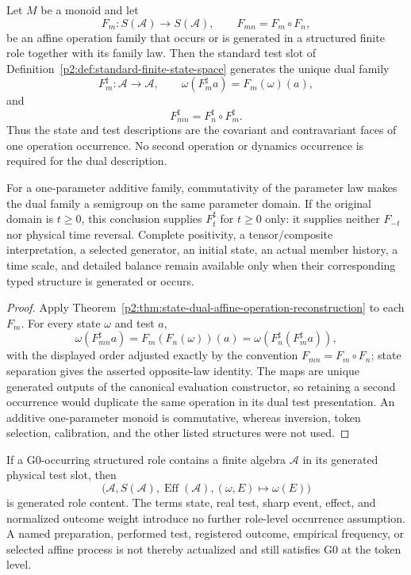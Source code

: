 \documentclass[12pt,a4paper]{article}
\begin{document}
\begin{corollary}
\label{p2a:cor:finite-state-test-dual-dynamics}
Let \(M\) be a monoid and let
\[
 F_m:S(\mathcal A)\longrightarrow S(\mathcal A),
 \qquad F_{mn}=F_m\circ F_n,
\]
be an affine operation family that occurs or is generated in a structured
finite role together with its family law.  Then the standard test slot of
Definition~\ref{p2:def:standard-finite-state-space} generates the unique dual
family
\[
 F_m^\sharp:\mathcal A\longrightarrow\mathcal A,
 \qquad
 \omega(F_m^\sharp a)=F_m(\omega)(a),
\]
and
\[
 F_{mn}^\sharp=F_n^\sharp\circ F_m^\sharp.
\]
Thus the state and test descriptions are the covariant and contravariant
faces of one operation occurrence.  No second operation or dynamics
occurrence is required for the dual description.

For a one-parameter additive family, commutativity of the parameter law makes
the dual family a semigroup on the same parameter domain.  If the original
domain is \(t\ge0\), this conclusion supplies \(F_t^\sharp\) for \(t\ge0\)
only: it supplies neither \(F_{-t}\) nor physical time reversal.  Complete
positivity, a tensor/composite interpretation, a selected generator, an
initial state, an actual member history, a time scale, and detailed balance
remain available only when their corresponding typed structure is generated
or occurs.
\end{corollary}

\begin{proof}
Apply Theorem~\ref{p2:thm:state-dual-affine-operation-reconstruction} to each
\(F_m\).  For every state \(\omega\) and test \(a\),
\[
 \omega(F_{mn}^\sharp a)
 =F_m(F_n(\omega))(a)
 =\omega\!\left(F_n^\sharp(F_m^\sharp a)\right),
\]
with the displayed order adjusted exactly by the convention
\(F_{mn}=F_m\circ F_n\); state separation gives the asserted opposite-law
identity.  The maps are unique generated outputs of the canonical evaluation
constructor, so retaining a second occurrence would duplicate the same
operation in its dual test presentation.  An additive one-parameter monoid is
commutative, whereas inversion, token selection, calibration, and the other
listed structures were not used.
\end{proof}

\begin{corollary}
\label{p2:cor:generated-state-test-role-no-duplicate-witness}
If a G0-occurring structured role contains a finite algebra \(\mathcal A\) in
its generated physical test slot, then
\[
 \bigl(\mathcal A,S(\mathcal A),\operatorname{Eff}(\mathcal A),
       (\omega,E)\mapsto\omega(E)\bigr)
\]
is generated role content.  The terms state, real test, sharp event, effect,
and normalized outcome weight introduce no further role-level occurrence
assumption.  A named preparation, performed test, registered outcome,
empirical frequency, or selected affine process is not thereby actualized and
still satisfies G0 at the token level.
\end{corollary}
\end{document}
